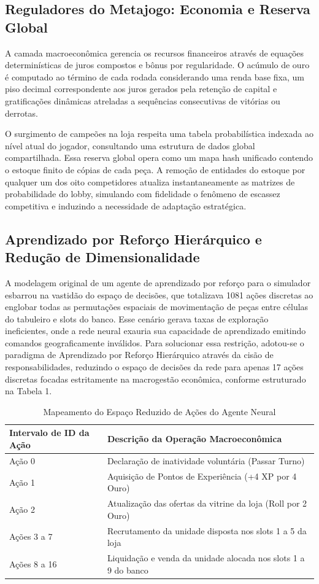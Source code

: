\documentclass[12pt]{article}
\begin{document}
\subsection{Reguladores do Metajogo: Economia e Reserva Global}
A camada macroeconômica gerencia os recursos financeiros através de equações determinísticas de juros compostos e bônus por regularidade. O acúmulo de ouro é computado ao término de cada rodada considerando uma renda base fixa, um piso decimal correspondente aos juros gerados pela retenção de capital e gratificações dinâmicas atreladas a sequências consecutivas de vitórias ou derrotas.

O surgimento de campeões na loja respeita uma tabela probabilística indexada ao nível atual do jogador, consultando uma estrutura de dados global compartilhada. Essa reserva global opera como um mapa hash unificado contendo o estoque finito de cópias de cada peça. A remoção de entidades do estoque por qualquer um dos oito competidores atualiza instantaneamente as matrizes de probabilidade do lobby, simulando com fidelidade o fenômeno de escassez competitiva e induzindo a necessidade de adaptação estratégica.

\subsection{Aprendizado por Reforço Hierárquico e Redução de Dimensionalidade}
A modelagem original de um agente de aprendizado por reforço para o simulador esbarrou na vastidão do espaço de decisões, que totalizava 1081 ações discretas ao englobar todas as permutações espaciais de movimentação de peças entre células do tabuleiro e slots do banco. Esse cenário gerava taxas de exploração ineficientes, onde a rede neural exauria sua capacidade de aprendizado emitindo comandos geograficamente inválidos. Para solucionar essa restrição, adotou-se o paradigma de Aprendizado por Reforço Hierárquico através da cisão de responsabilidades, reduzindo o espaço de decisões da rede para apenas 17 ações discretas focadas estritamente na macrogestão econômica, conforme estruturado na Tabela 1.

\begin{table}[h]
\centering
\caption{Mapeamento do Espaço Reduzido de Ações do Agente Neural}
\label{tab:acoes}
\begin{tabular}{ll}
\hline
\textbf{Intervalo de ID da Ação} & \textbf{Descrição da Operação Macroeconômica} \\ \hline
Ação 0 & Declaração de inatividade voluntária (Passar Turno) \\
Ação 1 & Aquisição de Pontos de Experiência (+4 XP por 4 Ouro) \\
Ação 2 & Atualização das ofertas da vitrine da loja (Roll por 2 Ouro) \\
Ações 3 a 7 & Recrutamento da unidade disposta nos slots 1 a 5 da loja \\
Ações 8 a 16 & Liquidação e venda da unidade alocada nos slots 1 a 9 do banco \\ \hline
\end{tabular}
\end{table}
\end{document}
